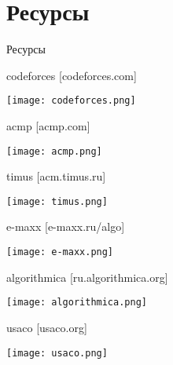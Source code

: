 \section{Ресурсы}

\begin{frame}
    \center \Huge Ресурсы
\end{frame}


\begin{frame}
    \center codeforces [codeforces.com]

    \center\texttt{[image: codeforces.png]}
\end{frame}


\begin{frame}
    \center acmp [acmp.com]

    \center\texttt{[image: acmp.png]}
\end{frame}


\begin{frame}
    \center timus [acm.timus.ru]

    \center\texttt{[image: timus.png]}
\end{frame}


\begin{frame}
    \center e-maxx [e-maxx.ru/algo]

    \center\texttt{[image: e-maxx.png]}
\end{frame}


\begin{frame}
    \center algorithmica [ru.algorithmica.org]

    \center\texttt{[image: algorithmica.png]}
\end{frame}


\begin{frame}
    \center usaco [usaco.org]

    \center\texttt{[image: usaco.png]}
\end{frame}

